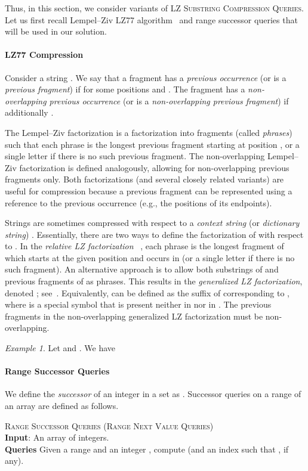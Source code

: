 \documentclass[a4paper]{article}
\theoremstyle{definition}
\theoremstyle{remark}
\newtheorem{example}[theorem]{Example}
\newcommand{\LSC}{\textsc{LZ Substring Compression Queries}\xspace}
\newenvironment{dsproblem}[1]
{\begin{center}\begin{lrbox}{\mybox}\begin{minipage}{0.96\columnwidth}{\textsc{#1}}\\}
{\end{minipage}\end{lrbox}\fbox{\usebox{\mybox}}\end{center}}
\newcommand{\defdsproblem}[2]{
  \begin{dsproblem}{#1}
#2
  \end{dsproblem}
  }
\begin{document}
Thus, in this section, we consider variants of \LSC.
Let us first recall Lempel--Ziv LZ77 algorithm~\cite{DBLP:journals/tit/ZivL77} and range successor queries that will be used in our solution.

\paragraph{LZ77 Compression}
Consider a string . We say that a fragment  has a \emph{previous occurrence} (or is a \emph{previous fragment}) if  for some positions  and . The fragment  has a \emph{non-overlapping previous occurrence} (or is a \emph{non-overlapping previous fragment}) if additionally .

The Lempel--Ziv factorization  is a factorization  into fragments (called \emph{phrases}) such that 
each phrase  is the longest previous fragment starting at position ,
or a single letter if there is no such previous fragment.
The non-overlapping Lempel--Ziv factorization  is defined analogously, allowing for non-overlapping previous fragments only.
Both factorizations (and several closely related variants) are useful for compression
because a previous fragment can be represented using a reference to the previous occurrence (e.g., the positions of its endpoints).

Strings  are sometimes compressed with respect to a \emph{context string} (or \emph{dictionary string}) .
Essentially, there are two ways to define the factorization  of  with respect to .
In the \emph{relative LZ factorization}~\cite{DBLP:journals/tit/ZivM93,DBLP:conf/spire/KuruppuPZ10} , each phrase is the longest fragment of  which starts at the given position and occurs in  (or a single letter if there is no such fragment).
An alternative approach is to allow both substrings of  and previous fragments of  as phrases. This results in the \emph{generalized LZ factorization}, denoted ; see~\cite{DBLP:conf/soda/CormodeM05,DBLP:journals/tcs/KellerKFL14}.
Equivalently,   can be defined as the suffix of  corresponding to , where  is a special symbol that is present neither in  nor in .
The previous fragments in the non-overlapping generalized LZ factorization  must be non-overlapping.
\begin{example}
Let  and .
We have

\end{example}

\paragraph{Range Successor Queries}
We define the \emph{successor} of an integer  in a set  as
.
Successor queries on a range  of an array  are defined as follows.
\defdsproblem{\textsc{Range Successor Queries (Range Next Value Queries)}}{
  \textbf{Input}: An array  of  integers.\\
\textbf{Queries} Given a range  and an integer , compute  (and an index  such that , if any).}
\end{document}
